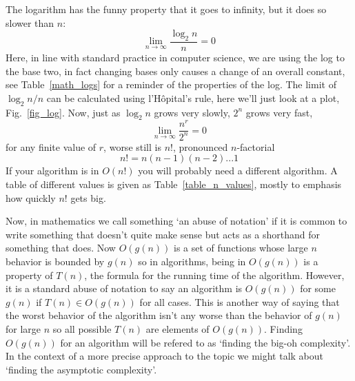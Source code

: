\documentclass[11pt,a4paper]{scrartcl}
\begin{document}
The logarithm has the funny property that it goes to infinity, but it
does so slower than $n$:
\begin{equation}
\lim_{n\rightarrow \infty}\frac{\log_2{n}}{n}=0
\end{equation}
Here, in line with standard practice in computer science, we are using
the log to the base two, in fact changing bases only causes a change
of an overall constant, see Table~\ref{math_logs} for a reminder of
the properties of the log. The limit of $\log_2{n}/n$ can be
calculated using l'H\^{o}pital's rule, here we'll just look at a plot,
Fig.~\ref{fig_log}. Now, just as $\log_2{n}$ grows very slowly, $2^n$
grows very fast,
\begin{equation}
\lim_{n\rightarrow \infty}\frac{n^r}{2^n}=0
\end{equation}
for any finite value of $r$, worse still is $n!$, pronounced $n$-factorial
\begin{equation}
n!=n(n-1)(n-2) . . . 1
\end{equation}
If your algorithm is in $O(n!)$ you will probably need a different
algorithm. A table of different values is given as
Table~\ref{table_n_values}, mostly to emphasis how quickly $n!$ gets
big.

Now, in mathematics we call something \lq{}an abuse of notation\rq{}
if it is common to write something that doesn't quite make sense but
acts as a shorthand for something that does. Now $O(g(n))$ is a set of
functions whose large $n$ behavior is bounded by $g(n)$ so in
algorithms, being in $O(g(n))$ is a property of $T(n)$, the formula
for the running time of the algorithm. However, it is a standard abuse
of notation to say an algorithm is $O(g(n))$ for some $g(n)$ if
$T(n)\in O(g(n))$ for all cases. This is another way of saying that
the worst behavior of the algorithm isn't any worse than the behavior
of $g(n)$ for large $n$ so all possible $T(n)$ are elements of
$O(g(n))$. Finding $O(g(n))$ for an algorithm will be refered to as
\lq{}finding the big-oh complexity\rq{}. In the context of a more precise approach to the topic we might talk about \lq{}finding the asymptotic complexity\rq{}.
\end{document}
